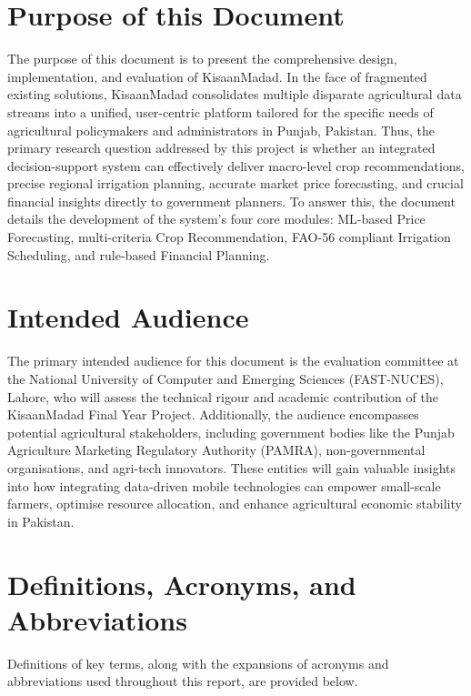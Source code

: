 \documentclass{FastFyp}
\begin{document}
\section{Purpose of this Document}
The purpose of this document is to present the comprehensive design, implementation, and evaluation of KisaanMadad. In the face of fragmented existing solutions, KisaanMadad consolidates multiple disparate agricultural data streams into a unified, user-centric platform tailored for the specific needs of agricultural policymakers and administrators in Punjab, Pakistan. Thus, the primary research question addressed by this project is whether an integrated decision-support system can effectively deliver macro-level crop recommendations, precise regional irrigation planning, accurate market price forecasting, and crucial financial insights directly to government planners. To answer this, the document details the development of the system's four core modules: ML-based Price Forecasting, multi-criteria Crop Recommendation, FAO-56 compliant Irrigation Scheduling, and rule-based Financial Planning.

\section{Intended Audience}
The primary intended audience for this document is the evaluation committee at the National University of Computer and Emerging Sciences (FAST-NUCES), Lahore, who will assess the technical rigour and academic contribution of the KisaanMadad Final Year Project. Additionally, the audience encompasses potential agricultural stakeholders, including government bodies like the Punjab Agriculture Marketing Regulatory Authority (PAMRA), non-governmental organisations, and agri-tech innovators. These entities will gain valuable insights into how integrating data-driven mobile technologies can empower small-scale farmers, optimise resource allocation, and enhance agricultural economic stability in Pakistan.

\section{Definitions, Acronyms, and Abbreviations}
Definitions of key terms, along with the expansions of acronyms and abbreviations used throughout this report, are provided below.
\end{document}
